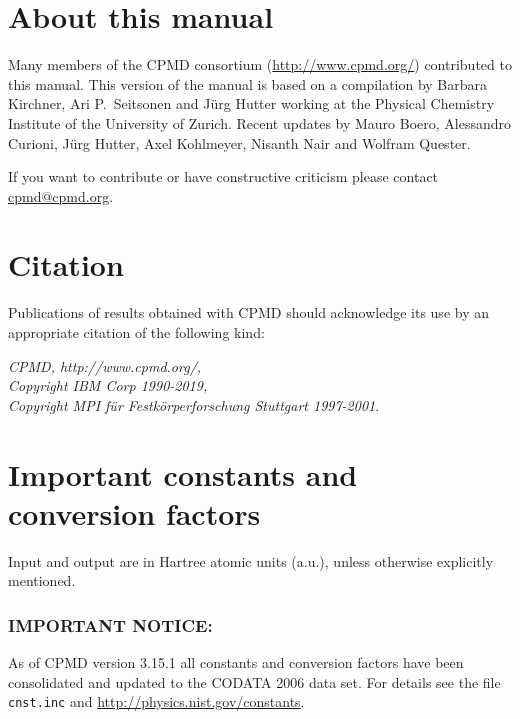 \documentclass[twoside,10pt,titlepage,a4paper]{article}
\newcommand{\htref}[2]{\href{#1}{#2}}
\newcommand{\htref}[2]{\htmladdnormallink{#2}{#1}}
\begin{document}
\section{About this manual}\label{about}

  Many members of the CPMD consortium
(\htref{http://www.cpmd.org/}{http://www.cpmd.org/}) contributed to this manual.
This version of the manual is based on a compilation by Barbara Kirchner,
Ari P.~Seitsonen and J\"urg Hutter working at the Physical Chemistry Institute
of the University of Zurich. Recent updates by Mauro Boero, Alessandro Curioni,
J\"urg Hutter, Axel Kohlmeyer, Nisanth Nair and Wolfram Quester.

  If you want to contribute or have constructive criticism please contact
\htref{mailto:cpmd@cpmd.org}{cpmd@cpmd.org}.

\vspace{5mm}

\section{Citation}\label{citation}
%
Publications of results obtained with CPMD should acknowledge its
use by an appropriate citation of the following kind:
\vspace{5mm}

\noindent
\textit{CPMD, http://www.cpmd.org/,\\
 Copyright IBM Corp 1990-2019,\\
 Copyright MPI f\"ur Festk\"orperforschung Stuttgart 1997-2001}.
%

\vspace{5mm}

\section{Important constants and conversion factors}
Input and output are in Hartree atomic units (a.u.),
unless otherwise explicitly mentioned.

\subsubsection*{IMPORTANT NOTICE:}
 As of CPMD version 3.15.1 all constants and conversion factors
 have been consolidated and updated to the CODATA 2006 data 
 set\cite{codata2006}. For details see the file {\tt cnst.inc} and
\htref{http://physics.nist.gov/constants}%
{http://physics.nist.gov/constants}.
\end{document}
